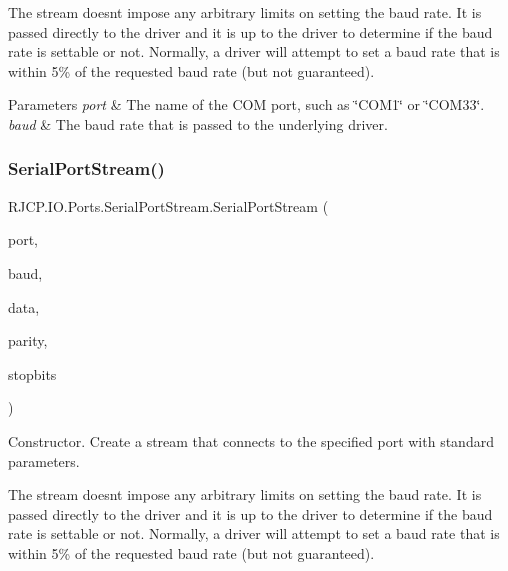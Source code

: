 The stream doesn\textquotesingle{}t impose any arbitrary limits on setting the baud rate. It is passed directly to the driver and it is up to the driver to determine if the baud rate is settable or not. Normally, a driver will attempt to set a baud rate that is within 5\% of the requested baud rate (but not guaranteed). 


\begin{DoxyParams}{Parameters}
{\em port} & The name of the C\+OM port, such as \char`\"{}\+C\+O\+M1\char`\"{} or \char`\"{}\+C\+O\+M33\char`\"{}.\\
\hline
{\em baud} & The baud rate that is passed to the underlying driver.\\
\hline
\end{DoxyParams}
\mbox{\label{class_r_j_c_p_1_1_i_o_1_1_ports_1_1_serial_port_stream_a312ee3a066ded257a78d3e8e0e096542}} 
\subsubsection{\texorpdfstring{SerialPortStream()}{SerialPortStream()}\hspace{0.1cm}{\footnotesize\ttfamily [4/4]}}
{\footnotesize\ttfamily R\+J\+C\+P.\+I\+O.\+Ports.\+Serial\+Port\+Stream.\+Serial\+Port\+Stream (\begin{DoxyParamCaption}\item[{string}]{port,  }\item[{int}]{baud,  }\item[{int}]{data,  }\item[{\mbox{\hyperlink{namespace_r_j_c_p_1_1_i_o_1_1_ports_a35c8c760a80dd0392e605dd3ad169954}{Parity}}}]{parity,  }\item[{\mbox{\hyperlink{namespace_r_j_c_p_1_1_i_o_1_1_ports_a56a13b591d46736acafe20f2976c84fa}{Stop\+Bits}}}]{stopbits }\end{DoxyParamCaption})}



Constructor. Create a stream that connects to the specified port with standard parameters. 

The stream doesn\textquotesingle{}t impose any arbitrary limits on setting the baud rate. It is passed directly to the driver and it is up to the driver to determine if the baud rate is settable or not. Normally, a driver will attempt to set a baud rate that is within 5\% of the requested baud rate (but not guaranteed). 

